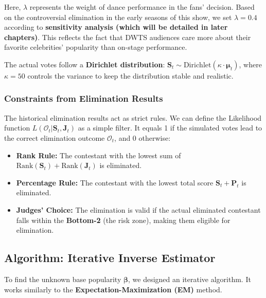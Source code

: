 Here, $\lambda$ represents the weight of dance performance in the fans' decision.
Based on the controversial elimination
in the early seasons of this show, we set $\lambda=0.4$ according to \textbf{sensitivity analysis (which will be detailed in later chapters)}. This reflects the fact that DWTS audiences care more about their favorite celebrities' popularity than on-stage performance. 

The actual votes follow a \textbf{Dirichlet distribution}:
$\mathbf{S}_t \sim \text{Dirichlet}(\kappa \cdot \boldsymbol{\mu}_t)$,
where $\kappa=50$ controls the variance to keep the distribution stable and realistic.

\subsubsection{Constraints from Elimination Results}
The historical elimination results act as strict rules.
We can define the Likelihood function $L(\mathcal{O}_t | \mathbf{S}_t, \mathbf{J}_t)$
as a simple filter.
It equals 1 if the simulated votes lead to the correct elimination outcome $\mathcal{O}_t$, and 0 otherwise:
\begin{itemize}
    \item \textbf{Rank Rule:} The contestant with the lowest sum of $\text{Rank}(\mathbf{S}_t) + \text{Rank}(\mathbf{J}_t)$ is eliminated.
    \item \textbf{Percentage Rule:} The contestant with the lowest total score $\mathbf{S}_t + \mathbf{P}_t$ is eliminated.
    \item \textbf{Judges' Choice:} The elimination is valid if the actual eliminated contestant falls within the \textbf{Bottom-2} (the risk zone), making them eligible for elimination.
\end{itemize}

\subsection{Algorithm: Iterative Inverse Estimator}

To find the unknown base popularity $\boldsymbol{\beta}$, we designed an iterative algorithm. It works similarly to the \textbf{Expectation-Maximization (EM)} method.

